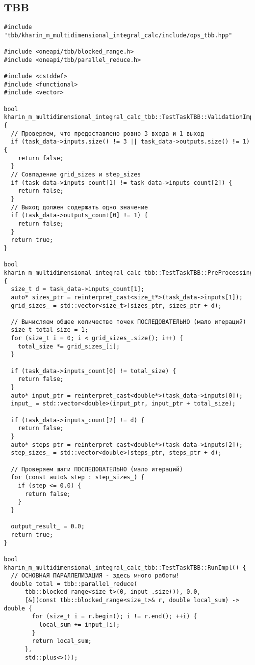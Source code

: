 \documentclass[12pt]{article}
\begin{document}
\subsection*{TBB}
\begin{lstlisting}
#include "tbb/kharin_m_multidimensional_integral_calc/include/ops_tbb.hpp"

#include <oneapi/tbb/blocked_range.h>
#include <oneapi/tbb/parallel_reduce.h>

#include <cstddef>
#include <functional>
#include <vector>

bool kharin_m_multidimensional_integral_calc_tbb::TestTaskTBB::ValidationImpl() {
  // Проверяем, что предоставлено ровно 3 входа и 1 выход
  if (task_data->inputs.size() != 3 || task_data->outputs.size() != 1) {
    return false;
  }
  // Совпадение grid_sizes и step_sizes
  if (task_data->inputs_count[1] != task_data->inputs_count[2]) {
    return false;
  }
  // Выход должен содержать одно значение
  if (task_data->outputs_count[0] != 1) {
    return false;
  }
  return true;
}

bool kharin_m_multidimensional_integral_calc_tbb::TestTaskTBB::PreProcessingImpl() {
  size_t d = task_data->inputs_count[1];
  auto* sizes_ptr = reinterpret_cast<size_t*>(task_data->inputs[1]);
  grid_sizes_ = std::vector<size_t>(sizes_ptr, sizes_ptr + d);

  // Вычисляем общее количество точек ПОСЛЕДОВАТЕЛЬНО (мало итераций)
  size_t total_size = 1;
  for (size_t i = 0; i < grid_sizes_.size(); i++) {
    total_size *= grid_sizes_[i];
  }

  if (task_data->inputs_count[0] != total_size) {
    return false;
  }
  auto* input_ptr = reinterpret_cast<double*>(task_data->inputs[0]);
  input_ = std::vector<double>(input_ptr, input_ptr + total_size);

  if (task_data->inputs_count[2] != d) {
    return false;
  }
  auto* steps_ptr = reinterpret_cast<double*>(task_data->inputs[2]);
  step_sizes_ = std::vector<double>(steps_ptr, steps_ptr + d);

  // Проверяем шаги ПОСЛЕДОВАТЕЛЬНО (мало итераций)
  for (const auto& step : step_sizes_) {
    if (step <= 0.0) {
      return false;
    }
  }

  output_result_ = 0.0;
  return true;
}

bool kharin_m_multidimensional_integral_calc_tbb::TestTaskTBB::RunImpl() {
  // ОСНОВНАЯ ПАРАЛЛЕЛИЗАЦИЯ - здесь много работы!
  double total = tbb::parallel_reduce(
      tbb::blocked_range<size_t>(0, input_.size()), 0.0,
      [&](const tbb::blocked_range<size_t>& r, double local_sum) -> double {
        for (size_t i = r.begin(); i != r.end(); ++i) {
          local_sum += input_[i];
        }
        return local_sum;
      },
      std::plus<>());


\end{lstlisting}
\end{document}
